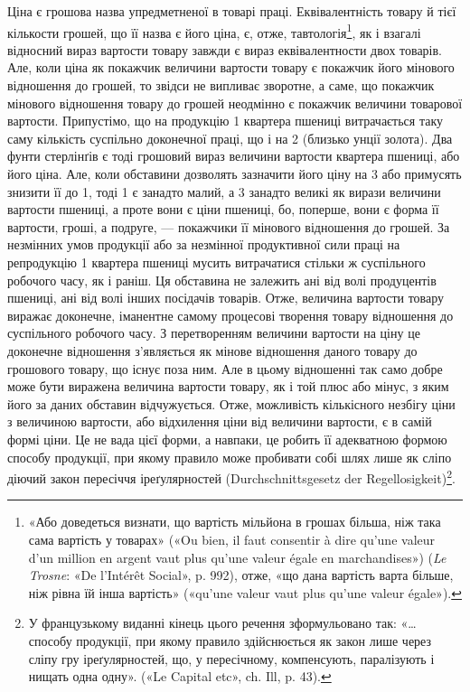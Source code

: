 Ціна є грошова назва упредметненої в товарі праці. Еквівалентність
товару й тієї кількости грошей, що її назва є його ціна, є,
отже, тавтологія\footnote{
«Або доведеться визнати, що вартість мільйона в грошах більша,
ніж така сама вартість у товарах» («Ou bien, il faut consentir à dire qu’une
valeur d’un million en argent vaut plus qu’une valeur égale en marchandises»)
(\emph{Le Trosne}: «De l’Intérêt Social», p. 992), отже, «що дана вартість варта
більше, ніж рівна їй інша вартість» («qu’une valeur vaut plus qu’une valeur
égale»).
}, як і взагалі відносний вираз вартости товару
завжди є вираз еквівалентности двох товарів. Але, коли ціна
як покажчик величини вартости товару є покажчик його мінового
відношення до грошей, то звідси не випливає зворотне,
а саме, що покажчик мінового відношення товару до грошей
неодмінно є покажчик величини товарової вартости. Припустімо,
що на продукцію 1 квартера пшениці витрачається таку саму
кількість суспільно доконечної праці, що і на 2
(близько  унції золота). Два фунти стерлінґів є тоді грошовий
вираз величини вартости квартера пшениці, або його ціна.
Але, коли обставини дозволять зазначити його ціну на 3 або примусять знизити її до 1, тоді
1 є занадто малий, а 3 занадто
великі як вирази величини вартости пшениці, а проте вони є
ціни пшениці, бо, поперше, вони є форма її вартости, гроші, а
подруге, — покажчики її мінового відношення до грошей. За
незмінних умов продукції або за незмінної продуктивної сили
праці на репродукцію 1 квартера пшениці мусить витрачатися
стільки ж суспільного робочого часу, як і раніш. Ця обставина
не залежить ані від волі продуцентів пшениці, ані від волі інших
посідачів товарів. Отже, величина вартости товару виражає доконечне,
іманентне самому процесові творення товару відношення
до суспільного робочого часу. З перетворенням величини вартости
на ціну це доконечне відношення з’являється як мінове
відношення даного товару до грошового товару, що існує поза
ним. Але в цьому відношенні так само добре може бути виражена
величина вартости товару, як і той плюс або мінус, з яким його
за даних обставин відчужується. Отже, можливість кількісного
незбігу ціни з величиною вартости, або відхилення ціни від величини
вартости, є в самій формі ціни. Це не вада цієї форми, а
навпаки, це робить її адекватною формою способу продукції,
при якому правило може пробивати собі шлях лише як сліпо
діючий закон пересіччя іреґулярностей (Durchschnittsgesetz der
Regellosigkeit)\footnote*{
У французькому виданні кінець цього речення зформульовано
так: «\dots{} способу продукції, при якому правило здійснюється як закон
лише через сліпу гру іреґулярностей, що, у пересічному, компенсують,
паралізують і нищать одна одну». («Le Capital etc», ch. Ill, p. 43). 
}.

